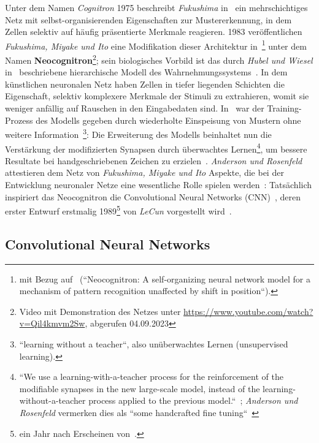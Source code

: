 Unter dem Namen \textit{Cognitron} 1975 beschreibt \textit{Fukushima} in~\cite{Fuk75} ein mehrschichtiges Netz mit selbst-organisierenden Eigenschaften zur Mustererkennung, in dem Zellen selektiv auf häufig präsentierte Merkmale reagieren.
1983 veröffentlichen \textit{Fukushima, Miyake und Ito} eine Modifikation dieser Architektur in~\cite{FMI83}\footnote{
    mit Bezug auf~\cite{Fuk80} (``Neocognitron: A self-organizing neural network model for a mechanism of pattern recognition unaffected by shift in position``).
} unter dem Namen \textbf{Neocognitron}\footnote{
    Video mit Demonstration des Netzes unter \url{https://www.youtube.com/watch?v=Qil4kmvm2Sw}, abgerufen 04.09.2023
}; sein biologisches Vorbild ist das durch \textit{Hubel und Wiesel} in~\cite{HW62} beschriebene hierarchische Modell des Wahrnehmungssystems~\cite[827]{FMI83}.
In dem künstlichen neuronalen Netz haben Zellen in tiefer liegenden Schichten die Eigenschaft, selektiv komplexere Merkmale der Stimuli zu extrahieren, womit sie weniger anfällig auf Rauschen in den Eingabedaten sind.
In~\cite{Fuk80} war der Training-Prozess des Modells gegeben durch wiederholte Einspeisung von Mustern ohne weitere Information~\cite[197]{Fuk80}\footnote{
    ``learning without a teacher``, also unüberwachtes Lernen (unsupervised learning).
}: Die Erweiterung des Modells beinhaltet nun die Verstärkung der modifizierten Synapsen durch überwachtes Lernen\footnote{
    ``We use a learning-with-a-teacher process for the reinforcement of the modifiable synapses in the new large-scale
model, instead of the learning-without-a-teacher process applied to the previous model.``~\cite[827]{FMI83}; \textit{Anderson und Rosenfeld} vermerken dies als ``some handcrafted fine tuning``~\cite[524 f.]{AR88}
}, um bessere Resultate bei handgeschriebenen Zeichen zu erzielen~\cite[829]{FMI83}.
\textit{Anderson und Rosenfeld} attestieren dem Netz von \textit{Fukushima, Miyake und Ito} Aspekte, die bei der Entwicklung neuronaler Netze eine wesentliche Rolle spielen werden~\cite[524]{AR88}:  Tatsächlich inspiriert das Neocognitron die Convolutional Neural Networks (CNN)~\cite[439]{LBH15}, deren erster Entwurf erstmalig 1989\footnote{
    ein Jahr nach Erscheinen von~\cite{AR88}.
} von \textit{LeCun} vorgestellt wird~\cite{Cun89}.



\subsection{Convolutional Neural Networks}\label{cnn}

